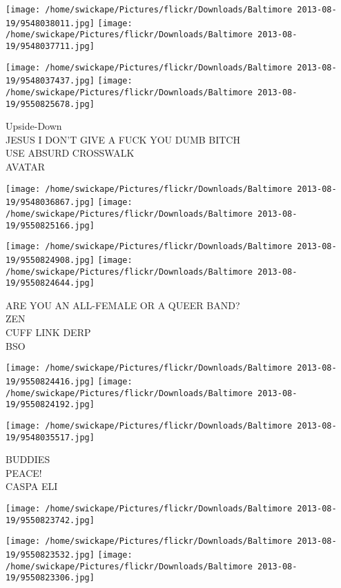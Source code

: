 \documentclass[10pt,letterpaper]{article}
\begin{document}
\texttt{[image: /home/swickape/Pictures/flickr/Downloads/Baltimore 2013-08-19/9548038011.jpg]}
\texttt{[image: /home/swickape/Pictures/flickr/Downloads/Baltimore 2013-08-19/9548037711.jpg]}

\texttt{[image: /home/swickape/Pictures/flickr/Downloads/Baltimore 2013-08-19/9548037437.jpg]}
\texttt{[image: /home/swickape/Pictures/flickr/Downloads/Baltimore 2013-08-19/9550825678.jpg]}

Upside{-}Down\\
JESUS I DON'T GIVE A FUCK YOU DUMB BITCH\\
USE ABSURD CROSSWALK\\
AVATAR\\
\pagebreak

\texttt{[image: /home/swickape/Pictures/flickr/Downloads/Baltimore 2013-08-19/9548036867.jpg]}
\texttt{[image: /home/swickape/Pictures/flickr/Downloads/Baltimore 2013-08-19/9550825166.jpg]}

\texttt{[image: /home/swickape/Pictures/flickr/Downloads/Baltimore 2013-08-19/9550824908.jpg]}
\texttt{[image: /home/swickape/Pictures/flickr/Downloads/Baltimore 2013-08-19/9550824644.jpg]}

ARE YOU AN ALL{-}FEMALE OR A QUEER BAND?\\
ZEN\\
CUFF LINK DERP\\
BSO\\
\pagebreak

\texttt{[image: /home/swickape/Pictures/flickr/Downloads/Baltimore 2013-08-19/9550824416.jpg]}
\texttt{[image: /home/swickape/Pictures/flickr/Downloads/Baltimore 2013-08-19/9550824192.jpg]}

\texttt{[image: /home/swickape/Pictures/flickr/Downloads/Baltimore 2013-08-19/9548035517.jpg]}

BUDDIES\\
PEACE!\\
CASPA ELI\\
\pagebreak

\texttt{[image: /home/swickape/Pictures/flickr/Downloads/Baltimore 2013-08-19/9550823742.jpg]}

\vspace{0.25in}
\texttt{[image: /home/swickape/Pictures/flickr/Downloads/Baltimore 2013-08-19/9550823532.jpg]}
\texttt{[image: /home/swickape/Pictures/flickr/Downloads/Baltimore 2013-08-19/9550823306.jpg]}
\end{document}
